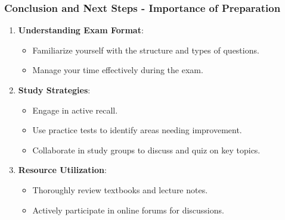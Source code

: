 \documentclass[aspectratio=169]{beamer}
\begin{document}
\begin{frame}[fragile]
    \frametitle{Conclusion and Next Steps - Importance of Preparation}
    \begin{enumerate}
        \item \textbf{Understanding Exam Format}:
            \begin{itemize}
                \item Familiarize yourself with the structure and types of questions.
                \item Manage your time effectively during the exam.
            \end{itemize}

        \item \textbf{Study Strategies}:
            \begin{itemize}
                \item Engage in active recall.
                \item Use practice tests to identify areas needing improvement.
                \item Collaborate in study groups to discuss and quiz on key topics.
            \end{itemize}

        \item \textbf{Resource Utilization}:
            \begin{itemize}
                \item Thoroughly review textbooks and lecture notes.
                \item Actively participate in online forums for discussions.
            \end{itemize}
    \end{enumerate}
\end{frame}
\end{document}
